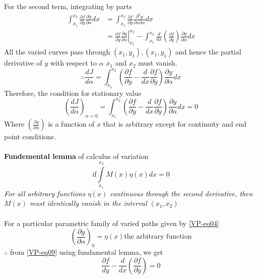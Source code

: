	For the second term, integrating by parts\\
	\begin{align*}
		\int_{x_{1}}^{x_{2}} \frac{\partial f}{\partial \dot{y}} \frac{\partial \dot{y}}{\partial \alpha} d x&=\int_{x_{1}}^{x_{2}} \frac{\partial f}{\partial \dot{y}} \frac{\partial^{2} y}{\partial x \partial \alpha} d x\\
		&=\left.\frac{\partial f}{\partial \dot{y}} \frac{\partial y}{\partial \alpha}\right|_{x_{1}} ^{x_{2}}-\int_{x_{1}}^{x_{2}} \frac{d}{d x}\left(\frac{\partial f}{\partial \dot{y}}\right) \frac{\partial y}{\partial \alpha} d x
	\end{align*}
All the varied curves pass through $(x_1,y_1),(x_1,y_1)$ and hence the partial derivative of $y$ with respect to  $\alpha$ $x_1$ and $x_2$ must vanish.
\begin{equation}
\therefore \frac{d J}{d \alpha}=\int_{x_{1}}^{x_{2}}\left(\frac{\partial f}{\partial y}-\frac{d}{d x} \frac{\partial f}{\partial \dot{y}}\right) \frac{\partial y}{\partial \alpha} d x
\end{equation}
Therefore, the condition for stationary value
\begin{equation}
\left(\frac{dJ}{d\alpha} \right)_{\alpha=0} =\int_{x_{1}}^{x_{2}}\left(\frac{\partial f}{\partial y}-\frac{d}{d x} \frac{\partial f}{\partial \dot{y}}\right) \frac{\partial y}{\partial \alpha} d x=0\label{VP-eq09}
\end{equation}
Where $\left( \frac{\partial y}{\partial \alpha}\right) $ is a function of $x$ that is arbitrary except for continuity and end point conditions.\\\\
\textbf{Fundemental lemma} of calculus of variation
	\begin{equation}
	\text{if} \int\limits_{x_1}^{x_2}M(x)\eta(x)dx=0
	\end{equation}
	\textit{For all arbitrary functions $\eta (x)$ continuous through the second derivative, then $M(x)$ must identically vanish in the interval $(x_1,x_2)$}\\\\
	For a particular parametric family of varied paths given by \ref{VP-eq04}
	$$\left(\frac{\partial y}{\partial\alpha} \right)_0 =\eta(x)\text{the arbitrary function}$$
	$\therefore$ from \ref{VP-eq09} using fundamental lemma, we get 
	\begin{equation}
	\frac{\partial f}{dy}-\frac{d}{dx}\left( \frac{\partial f}{\partial\dot{y}}\right) =0\label{VP-11}
	\end{equation}
